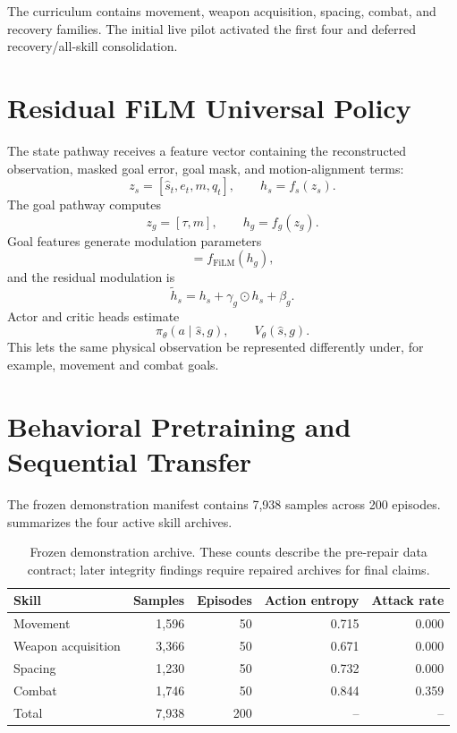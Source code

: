 \documentclass[11pt]{article}
\begin{document}
The curriculum contains movement, weapon acquisition, spacing, combat, and recovery families. The initial live pilot activated the first four and deferred recovery/all-skill consolidation.

\section{Residual FiLM Universal Policy}
The state pathway receives a feature vector containing the reconstructed observation, masked goal error, goal mask, and motion-alignment terms:
\begin{equation}
z_s=[\hat{s}_t,e_t,m,q_t],\qquad h_s=f_s(z_s).
\end{equation}
The goal pathway computes
\begin{equation}
z_g=[\tau,m],\qquad h_g=f_g(z_g).
\end{equation}
Goal features generate modulation parameters
\begin{equation}
[\gamma_g,\beta_g]=f_{\mathrm{FiLM}}(h_g),
\end{equation}
and the residual modulation is
\begin{equation}
\tilde h_s=h_s+\gamma_g\odot h_s+\beta_g.
\end{equation}
Actor and critic heads estimate
\begin{equation}
\pi_\theta(a\mid \hat{s},g),\qquad V_\theta(\hat{s},g).
\end{equation}
This lets the same physical observation be represented differently under, for example, movement and combat goals.

\section{Behavioral Pretraining and Sequential Transfer}
The frozen demonstration manifest contains 7,938 samples across 200 episodes.  summarizes the four active skill archives.

\begin{table}[t]
\centering
\caption{Frozen demonstration archive. These counts describe the pre-repair data contract; later integrity findings require repaired archives for final claims.}
\label{tab:demos}
\begin{tabular}{lrrrr}
\toprule
Skill & Samples & Episodes & Action entropy & Attack rate\\
\midrule
Movement & 1,596 & 50 & 0.715 & 0.000\\
Weapon acquisition & 3,366 & 50 & 0.671 & 0.000\\
Spacing & 1,230 & 50 & 0.732 & 0.000\\
Combat & 1,746 & 50 & 0.844 & 0.359\\
\midrule
Total & 7,938 & 200 & -- & --\\
\bottomrule
\end{tabular}
\end{table}
\end{document}
